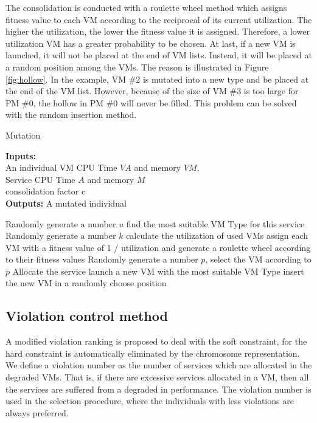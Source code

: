The consolidation is conducted with a roulette wheel method which assigns fitness value to each VM according to the reciprocal of its current utilization. 
The higher the utilization, the lower the fitness value
it is assigned. 
Therefore, a lower utilization VM has a greater probability to be chosen. 
At last, if a new VM is launched, it will not be placed at the end of VM lists. Instead, it will be placed at a random position among the VMs. The reason is illustrated in Figure \ref{fig:hollow}. In the example, VM \#2 is mutated into a new type and be placed at the end of the VM list. However, because of the size of VM \#3 is too large for PM \#0, the hollow in PM \#0 will never be filled. This problem can be solved with the random insertion method.
\begin{algorithm}[!htb]
 \caption{Mutation}
 \footnotesize
 \textbf{Inputs:} \\
  An individual
  VM CPU Time $VA$ and memory $VM$, \\
  Service CPU Time $A$ and memory $M$ \\
  consolidation factor c \\
 \textbf{Outputs:}
  A mutated individual

 \begin{algorithmic}[1]
    \STATE Randomly generate a number $u$
      \STATE find the most suitable VM Type for this service
      \STATE Randomly generate a number $k$
        \STATE calculate the utilization of used VMs
        \STATE assign each VM with a fitness value of 1 / utilization and generate a roulette wheel
            according to their fitness values
        \STATE Randomly generate a number $p$, select the VM according to $p$
        \STATE Allocate the service
      \ELSE
        \STATE launch a new VM with the most suitable VM Type
        \STATE insert the new VM in a randomly choose position
      \ENDIF
    \ENDIF
  \ENDFOR
 \end{algorithmic}
 \label{alg:mutation}
\end{algorithm}

\subsection{Violation control method}
A modified violation ranking is proposed to deal with the soft constraint, for the hard constraint is automatically eliminated by the chromosome representation.
We define a violation number as the number of services which are allocated in the degraded VMs. 
That is, if there are excessive services allocated in a VM, then all the services are suffered from a degraded in performance. 
The violation number is used in the selection procedure, 
where the individuals with less violations are always preferred.

